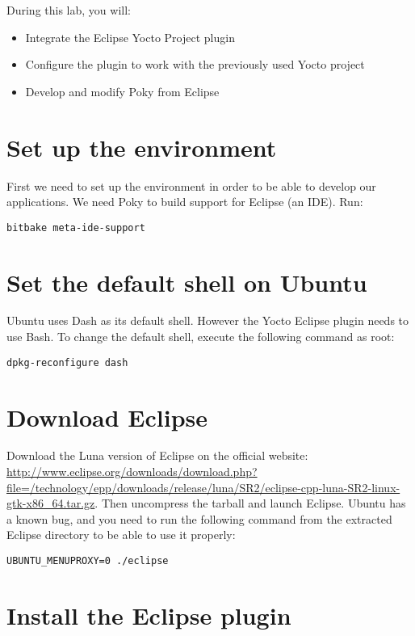
During this lab, you will:
\begin{itemize}
  \item Integrate the Eclipse Yocto Project plugin
  \item Configure the plugin to work with the previously used Yocto project
  \item Develop and modify Poky from Eclipse
\end{itemize}

\section{Set up the environment}

First we need to set up the environment in order to be able to develop our
applications. We need Poky to build support for Eclipse (an IDE). Run:

\begin{verbatim}
bitbake meta-ide-support
\end{verbatim}

\section{Set the default shell on Ubuntu}

Ubuntu uses Dash as its default shell. However the Yocto Eclipse
plugin needs to use Bash. To change the default shell, execute the
following command as root:
\begin{verbatim}
dpkg-reconfigure dash
\end{verbatim}

\section{Download Eclipse}

Download the Luna version of Eclipse on the official website:
\url{http://www.eclipse.org/downloads/download.php?file=/technology/epp/downloads/release/luna/SR2/eclipse-cpp-luna-SR2-linux-gtk-x86_64.tar.gz}.
Then uncompress the tarball and launch Eclipse. Ubuntu has a known bug, and
you need to run the following command from the extracted Eclipse directory to be
able to use it properly:
\begin{verbatim}
UBUNTU_MENUPROXY=0 ./eclipse
\end{verbatim}

\section{Install the Eclipse plugin}

